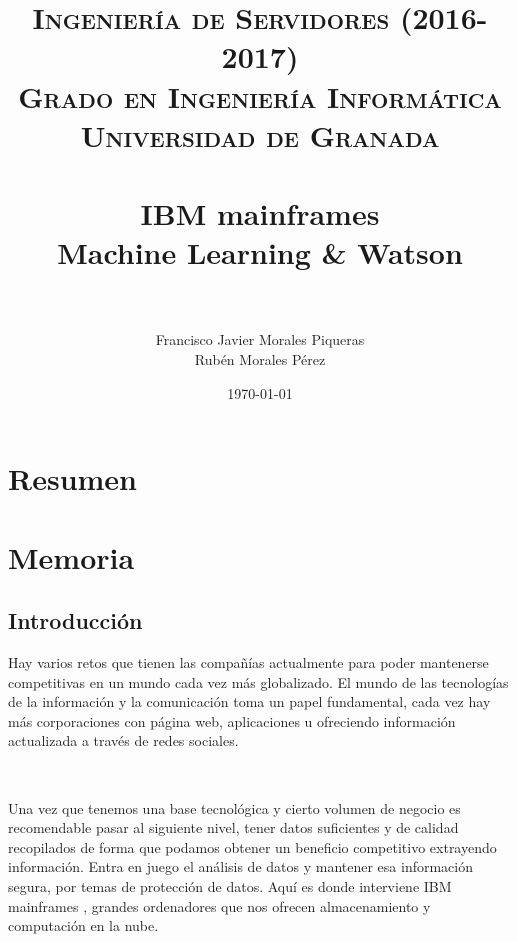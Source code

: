 \documentclass[paper=a4, fontsize=10pt]{scrartcl} %
\title{	
\normalfont \normalsize 
\textsc{\textbf{Ingeniería de Servidores (2016-2017)} \\ Grado en Ingeniería Informática \\ Universidad de Granada} \\ [25pt] %
\horrule{0.5pt} \\[0.4cm] %
\huge IBM mainframes \\ Machine Learning \& Watson \\ %
\horrule{2pt} \\[0.5cm] %
}
\author{Francisco Javier Morales Piqueras
	\\ Rubén Morales Pérez} %
\date{\normalsize\today} %
\numberwithin{equation}{section} %
\numberwithin{figure}{section} %
\numberwithin{table}{section} %
\begin{document}
\maketitle %
\newpage %
\tableofcontents %
\listoffigures
\listoftables

\newpage


\section{Resumen}


\section{Memoria}
\subsection{Introducción}
Hay varios retos que tienen las compañías actualmente para poder mantenerse competitivas en un mundo cada vez más globalizado.
El mundo de las tecnologías de la información y la comunicación toma un papel fundamental, cada vez hay más corporaciones con página web, aplicaciones u ofreciendo información actualizada a través de redes sociales.

\

Una vez que tenemos una base tecnológica  y cierto volumen de negocio es recomendable pasar al siguiente nivel, tener datos suficientes y de calidad recopilados de forma que podamos obtener un beneficio competitivo extrayendo información.
Entra en juego el análisis de datos y mantener esa información segura, por temas de protección de datos.
Aquí es donde interviene IBM mainframes \cite{ibm-m}, grandes ordenadores que nos ofrecen almacenamiento y computación en la nube.

\
\end{document}

